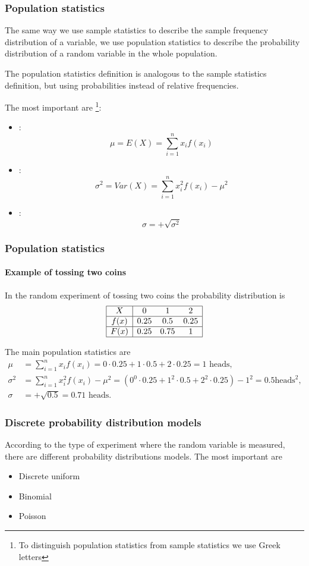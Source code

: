 \begin{frame}
\frametitle{Population statistics}
The same way we use sample statistics to describe the sample frequency distribution of a variable, we use population statistics to describe the probability distribution of a random variable in the whole population.

The population statistics definition is analogous to the sample statistics definition, but using probabilities instead of relative frequencies. 

The most important are \footnote{To distinguish population statistics from sample statistics we use Greek letters}:
\begin{itemize}
\item {}:
\[
\mu = E(X) = \sum_{i=1}^n x_i f(x_i)
\]
\item {}:
\[
\sigma^2 = Var(X) = \sum_{i=1}^n x_i^2 f(x_i) -\mu^2
\]
\item {}:
\[
\sigma = +\sqrt{\sigma^2}
\]
\end{itemize}
\end{frame}


\begin{frame}
\frametitle{Population statistics}
\framesubtitle{Example of tossing two coins}
In the random experiment of tossing two coins the probability distribution is  
\[
\begin{array}{|c|ccc|}
\hline
X & 0 & 1 & 2\\ \hline
f(x) & 0.25 & 0.5 & 0.25\\
\hline
F(x) & 0.25 & 0.75 & 1 \\
\hline
\end{array}
\]

The main population statistics are 
\begin{align*}
\mu &= \sum_{i=1}^n x_i f(x_i) = 0\cdot 0.25 + 1\cdot 0.5 + 2\cdot 0.25 = 1 \mbox{ heads},\\
\sigma^2 &= \sum_{i=1}^n x_i^2 f(x_i) -\mu^2 = (0^0\cdot 0.25 + 1^2\cdot 0.5 + 2^2\cdot 0.25) - 1^2 = 0.5 \mbox{
heads}^2,\\
\sigma &= +\sqrt{0.5} = 0.71 \mbox{ heads}.
\end{align*}
\end{frame}


\begin{frame}
\frametitle{Discrete probability distribution models}
According to the type of experiment where the random variable is measured, there are different probability distributions models. 
The most important are

\begin{itemize}
\item Discrete uniform
\item Binomial
\item Poisson 
\end{itemize}
\end{frame}


